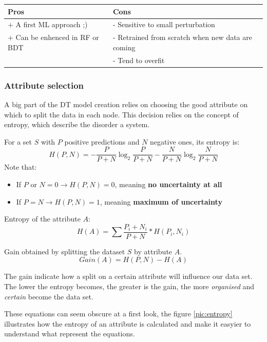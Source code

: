 \begin{center} %
\begin{tabular} {| l | l |}
\hline
\bf Pros & \bf Cons \\ \hline
+ A first ML approach ;) & - Sensitive to small perturbation  \\
+ Can be enhenced in RF or BDT  & - Retrained from scratch when new data are coming \\
 & - Tend to overfit \\ 
\hline
\end{tabular}
\end{center}



\subsubsection{Attribute selection}
\label{sec:selection}

A big part of the DT model creation relies on choosing the good attribute on which to split the data in each node. This decision relies on the concept of entropy, which describe the disorder a system.

For a set $S$ with $P$ positive predictions and $N$ negative ones, its entropy is:
$$
 H(P,N)=-\frac{P}{P+N}\log_2\frac{P}{P+N}-\frac{N}{P+N}\log_2\frac{N}{P+N}
$$
Note that:
\begin{itemize}
 \item If $P \text{ or } N=0 \rightarrow H(P,N)=0$, meaning \textbf{no uncertainty at all}
 \item If $P=N \rightarrow H(P,N)=1$, meaning \textbf{maximum of uncertainty}
\end{itemize}

Entropy of the attribute $A$:
$$
H(A) = \sum \frac{P_i + N_i}{P + N} * H(P_i, N_i)
$$

Gain obtained by splitting the dataset $S$ by attribute $A$.
$$
Gain(A) = H(P, N) - H(A)
$$

The gain indicate how a split on a certain attribute will influence our data set. The lower the entropy becomes, the greater is the gain, the more \textit{organised} and \textit{certain} become the data set.

These equations can seem obscure at a first look, the figure \ref{pic:entropy} illustrates how the entropy of an attribute is calculated and make it easyier to understand what represent the equations.


